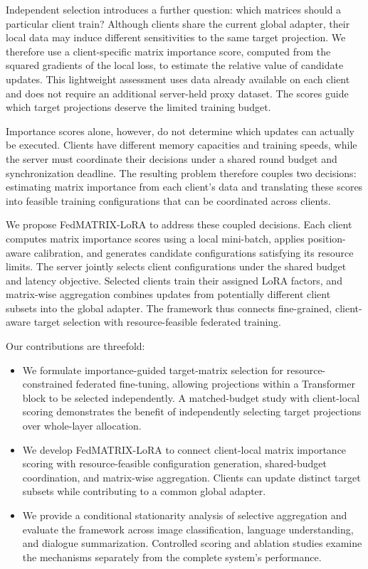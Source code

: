\documentclass[10pt,conference,letterpaper]{IEEEtran}
\begin{document}
Independent selection introduces a further question: which matrices should a particular client train? Although clients share the current global adapter, their local data may induce different sensitivities to the same target projection. We therefore use a client-specific matrix importance score, computed from the squared gradients of the local loss, to estimate the relative value of candidate updates. This lightweight assessment uses data already available on each client and does not require an additional server-held proxy dataset. The scores guide which target projections deserve the limited training budget.

Importance scores alone, however, do not determine which updates can actually be executed. Clients have different memory capacities and training speeds, while the server must coordinate their decisions under a shared round budget and synchronization deadline. The resulting problem therefore couples two decisions: estimating matrix importance from each client's data and translating these scores into feasible training configurations that can be coordinated across clients.

We propose FedMATRIX-LoRA to address these coupled decisions. Each client computes matrix importance scores using a local mini-batch, applies position-aware calibration, and generates candidate configurations satisfying its resource limits. The server jointly selects client configurations under the shared budget and latency objective. Selected clients train their assigned LoRA factors, and matrix-wise aggregation combines updates from potentially different client subsets into the global adapter. The framework thus connects fine-grained, client-aware target selection with resource-feasible federated training.

Our contributions are threefold:
\begin{itemize}
\item We formulate importance-guided target-matrix selection for resource-constrained federated fine-tuning, allowing projections within a Transformer block to be selected independently. A matched-budget study with client-local scoring demonstrates the benefit of independently selecting target projections over whole-layer allocation.
\item We develop FedMATRIX-LoRA to connect client-local matrix importance scoring with resource-feasible configuration generation, shared-budget coordination, and matrix-wise aggregation. Clients can update distinct target subsets while contributing to a common global adapter.
\item We provide a conditional stationarity analysis of selective aggregation and evaluate the framework across image classification, language understanding, and dialogue summarization. Controlled scoring and ablation studies examine the mechanisms separately from the complete system's performance.
\end{itemize}
\end{document}
